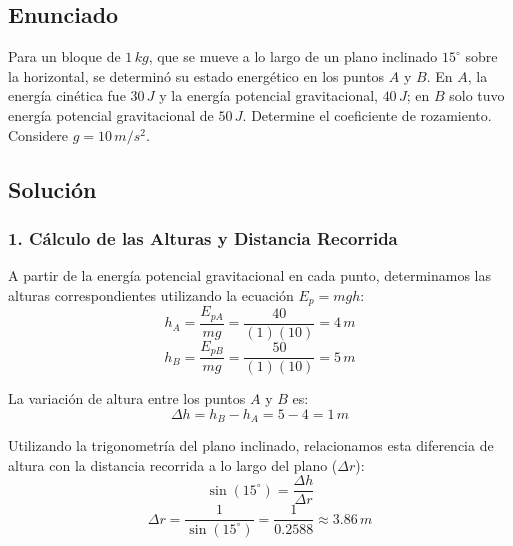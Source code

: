 \documentclass[12pt, a4paper]{article}
\begin{document}
\newpage

\subsection*{Enunciado}
Para un bloque de $1 \, \si{kg}$, que se mueve a lo largo de un plano inclinado $15^\circ$ sobre la horizontal, se determinó su estado energético en los puntos $A$ y $B$. En $A$, la energía cinética fue $30 \, \si{J}$ y la energía potencial gravitacional, $40 \, \si{J}$; en $B$ solo tuvo energía potencial gravitacional de $50 \, \si{J}$. Determine el coeficiente de rozamiento. Considere $g = 10 \, \si{m/s^2}$.

\begin{center}
\end{center}

\subsection*{Solución}

\subsubsection*{1. Cálculo de las Alturas y Distancia Recorrida}
A partir de la energía potencial gravitacional en cada punto, determinamos las alturas correspondientes utilizando la ecuación $E_p = mgh$:
$$ h_A = \frac{E_{pA}}{mg} = \frac{40}{(1)(10)} = 4 \, \si{m} $$
$$ h_B = \frac{E_{pB}}{mg} = \frac{50}{(1)(10)} = 5 \, \si{m} $$

La variación de altura entre los puntos $A$ y $B$ es:
$$ \Delta h = h_B - h_A = 5 - 4 = 1 \, \si{m} $$

Utilizando la trigonometría del plano inclinado, relacionamos esta diferencia de altura con la distancia recorrida a lo largo del plano ($\Delta r$):
$$ \sin(15^\circ) = \frac{\Delta h}{\Delta r} $$
$$ \Delta r = \frac{1}{\sin(15^\circ)} = \frac{1}{0.2588} \approx 3.86 \, \si{m} $$
\end{document}
